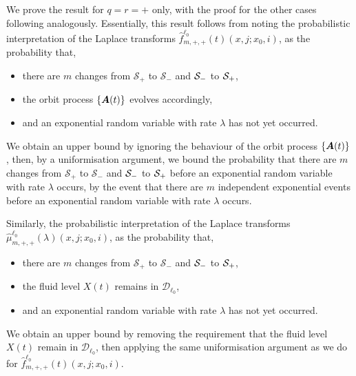 We prove the result for \(q=r=+\) only, with the proof for the other cases following analogously. Essentially, this result follows from noting the probabilistic interpretation of the Laplace transforms \(\widehat f^{\ell_0}_{m,+,+}(t)(x,j;x_0,i)\), as the probability that, 
\begin{itemize}
	\item there are \(m\) changes from \(\mathcal S_+\) to \(\mathcal S_-\) and \(\mathcal{S}_-\) to \(\mathcal{S}_+\), 
	\item the orbit process \(\{\boldsymbol A(t)\}\) evolves accordingly, 
	\item and an exponential random variable with rate \(\lambda\) has not yet occurred.
\end{itemize}
We obtain an upper bound by ignoring the behaviour of the orbit process \(\{\boldsymbol A(t)\}\), then, by a uniformisation argument, we bound the probability that there are \(m\) changes from \(\mathcal S_+\) to \(\mathcal S_-\) and \(\mathcal{S}_-\) to \(\mathcal{S}_+\) before an exponential random variable with rate \(\lambda\) occurs, by the event that there are \(m\) independent exponential events before an exponential random variable with rate \(\lambda\) occurs.

Similarly, the probabilistic interpretation of the Laplace transforms \(\widehat \mu^{\ell_0}_{m,+,+}(\lambda)(x,j;x_0,i)\), as the probability that, 
\begin{itemize}
	\item there are \(m\) changes from \(\mathcal S_+\) to \(\mathcal S_-\) and \(\mathcal{S}_-\) to \(\mathcal{S}_+\), 
	\item the fluid level \(X(t)\) remains in \(\mathcal D_{\ell_0}\), 
	\item and an exponential random variable with rate \(\lambda\) has not yet occurred.
\end{itemize}
We obtain an upper bound by removing the requirement that the fluid level \(X(t)\) remain in \(\mathcal D_{\ell_0}\), then applying the same uniformisation argument as we do for \(\widehat f^{\ell_0}_{m,+,+}(t)(x,j;x_0,i)\).

